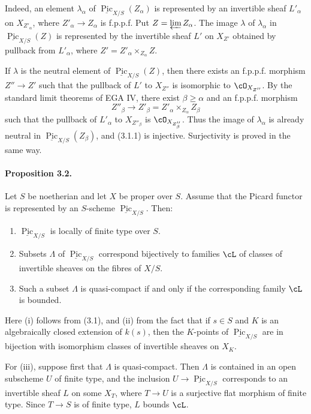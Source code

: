 \documentclass[11pt]{article}
\theoremstyle{plain}
\theoremstyle{definition}
\theoremstyle{remark}
\DeclareMathOperator{\Pic}{Pic}
\newcommand{\longto}{\longrightarrow}
\begin{document}
Indeed, an element $\lambda_\alpha$ of $\underline{\Pic}_{X/S}(Z_\alpha)$ is represented by an invertible sheaf $L'_\alpha$ on $X_{Z'_\alpha}$, where $Z'_\alpha\to Z_\alpha$ is f.p.p.f. Put $Z=\varprojlim Z_\alpha$. The image $\lambda$ of $\lambda_\alpha$ in $\underline{\Pic}_{X/S}(Z)$ is represented by the invertible sheaf $L'$ on $X_{Z'}$ obtained by pullback from $L'_\alpha$, where $Z'=Z'_\alpha\times_{Z_\alpha}Z$.

If $\lambda$ is the neutral element of $\underline{\Pic}_{X/S}(Z)$, then there exists an f.p.p.f. morphism $Z''\to Z'$ such that the pullback of $L'$ to $X_{Z''}$ is isomorphic to $\cO_{X_{Z''}}$. By the standard limit theorems of EGA IV, there exist $\beta\geq\alpha$ and an f.p.p.f. morphism
\[
Z''_\beta \longto Z'_\beta=Z'_\alpha\times_{Z_\alpha}Z_\beta
\]
such that the pullback of $L'_\alpha$ to $X_{Z''_\beta}$ is $\cO_{X_{Z''_\beta}}$. Thus the image of $\lambda_\alpha$ is already neutral in $\underline{\Pic}_{X/S}(Z_\beta)$, and (3.1.1) is injective. Surjectivity is proved in the same way.

\paragraph{Proposition 3.2.}
Let $S$ be noetherian and let $X$ be proper over $S$. Assume that the Picard functor is represented by an $S$-scheme $\underline{\Pic}_{X/S}$. Then:
\begin{enumerate}[label=\roman*)]
\item $\underline{\Pic}_{X/S}$ is locally of finite type over $S$.
\item Subsets $\Lambda$ of $\underline{\Pic}_{X/S}$ correspond bijectively to families $\cL$ of classes of invertible sheaves on the fibres of $X/S$.
\item Such a subset $\Lambda$ is quasi-compact if and only if the corresponding family $\cL$ is bounded.
\end{enumerate}

Here (i) follows from (3.1), and (ii) from the fact that if $s\in S$ and $K$ is an algebraically closed extension of $k(s)$, then the $K$-points of $\underline{\Pic}_{X/S}$ are in bijection with isomorphism classes of invertible sheaves on $X_K$.

For (iii), suppose first that $\Lambda$ is quasi-compact. Then $\Lambda$ is contained in an open subscheme $U$ of finite type, and the inclusion $U\to \underline{\Pic}_{X/S}$ corresponds to an invertible sheaf $L$ on some $X_T$, where $T\to U$ is a surjective flat morphism of finite type. Since $T\to S$ is of finite type, $L$ bounds $\cL$.
\end{document}
